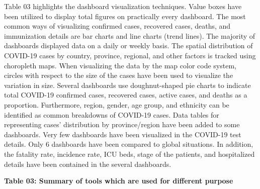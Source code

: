\documentclass[
]{article}
\begin{document}
Table 03 highlights the dashboard visualization techniques. Value boxes
have been utilized to display total figures on practically every
dashboard. The most common ways of visualizing confirmed cases,
recovered cases, deaths, and immunization details are bar charts and
line charts (trend lines). The majority of dashboards displayed data on
a daily or weekly basis. The spatial distribution of COVID-19 cases by
country, province, regional, and other factors is tracked using
choropleth maps. When visualizing the data by the map color code system,
circles with respect to the size of the cases have been used to
visualize the variation in size. Several dashboards use doughnut-shaped
pie charts to indicate total COVID-19 confirmed cases, recovered cases,
active cases, and deaths as a proportion. Furthermore, region, gender,
age group, and ethnicity can be identified as common breakdowns of
COVID-19 cases. Data tables for representing cases' distribution by
province/region have been added to some dashboards. Very few dashboards
have been visualized in the COVID-19 test details. Only 6 dashboards
have been compared to global situations. In addition, the fatality rate,
incidence rate, ICU beds, stage of the patients, and hospitalized
details have been contained in the several dashboards.\hfill\break

\textbf{Table 03: Summary of tools which are used for different purpose}
\end{document}
